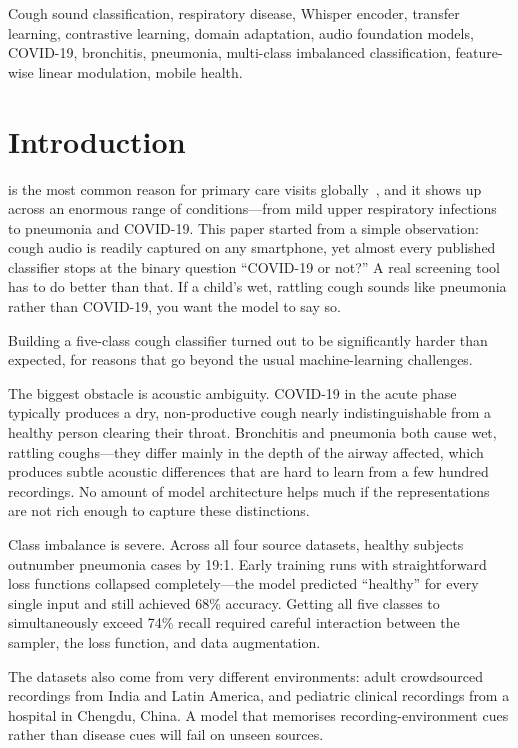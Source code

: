 \documentclass[10pt,journal,compsoc]{IEEEtran}
\begin{document}
\begin{IEEEkeywords}
Cough sound classification, respiratory disease, Whisper encoder, transfer
learning, contrastive learning, domain adaptation, audio foundation models,
COVID-19, bronchitis, pneumonia, multi-class imbalanced classification,
feature-wise linear modulation, mobile health.
\end{IEEEkeywords}

\section{Introduction}
\label{sec:intro}

 is the most common reason for primary care visits
globally~\cite{who_cough}, and it shows up across an enormous range of
conditions---from mild upper respiratory infections to pneumonia and COVID-19.
This paper started from a simple observation: cough audio is readily
captured on any smartphone, yet almost every published classifier stops at
the binary question ``COVID-19 or not?'' A real screening tool has to do better
than that. If a child's wet, rattling cough sounds like pneumonia rather than
COVID-19, you want the model to say so.

Building a five-class cough classifier turned out to be significantly harder
than expected, for reasons that go beyond the usual machine-learning challenges.

The biggest obstacle is acoustic ambiguity. COVID-19 in the acute phase
typically produces a dry, non-productive cough nearly indistinguishable
from a healthy person clearing their throat. Bronchitis and pneumonia both
cause wet, rattling coughs---they differ mainly in the depth of the airway
affected, which produces subtle acoustic differences that are hard to learn
from a few hundred recordings. No amount of model architecture helps much
if the representations are not rich enough to capture these distinctions.

Class imbalance is severe. Across all four source datasets, healthy subjects
outnumber pneumonia cases by 19:1. Early training runs with straightforward
loss functions collapsed completely---the model predicted ``healthy'' for
every single input and still achieved 68\% accuracy. Getting all five
classes to simultaneously exceed 74\% recall required careful interaction
between the sampler, the loss function, and data augmentation.

The datasets also come from very different environments: adult crowdsourced
recordings from India and Latin America, and pediatric clinical recordings
from a hospital in Chengdu, China. A model that memorises recording-environment
cues rather than disease cues will fail on unseen sources.
\end{document}
